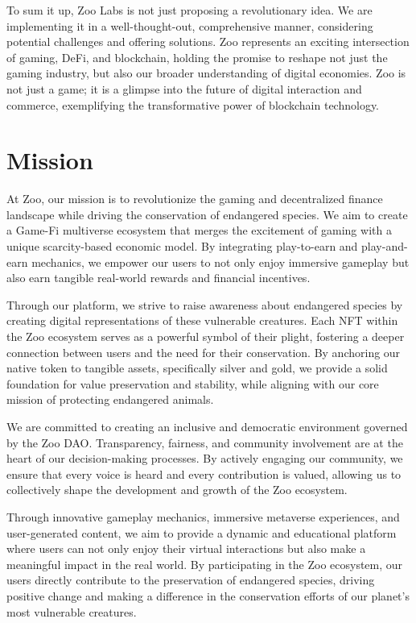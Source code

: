 To sum it up, Zoo Labs is not just proposing a revolutionary idea. We are implementing it in a well-thought-out, comprehensive manner, considering potential challenges and offering solutions. Zoo represents an exciting intersection of gaming, DeFi, and blockchain, holding the promise to reshape not just the gaming industry, but also our broader understanding of digital economies. Zoo is not just a game; it is a glimpse into the future of digital interaction and commerce, exemplifying the transformative power of blockchain technology.

\section{Mission}
\label{sec:mission}

At Zoo, our mission is to revolutionize the gaming and decentralized finance landscape while driving the conservation of endangered species. We aim to create a Game-Fi multiverse ecosystem that merges the excitement of gaming with a unique scarcity-based economic model. By integrating play-to-earn and play-and-earn mechanics, we empower our users to not only enjoy immersive gameplay but also earn tangible real-world rewards and financial incentives.

Through our platform, we strive to raise awareness about endangered species by creating digital representations of these vulnerable creatures. Each NFT within the Zoo ecosystem serves as a powerful symbol of their plight, fostering a deeper connection between users and the need for their conservation. By anchoring our native token to tangible assets, specifically silver and gold, we provide a solid foundation for value preservation and stability, while aligning with our core mission of protecting endangered animals.

We are committed to creating an inclusive and democratic environment governed by the Zoo DAO. Transparency, fairness, and community involvement are at the heart of our decision-making processes. By actively engaging our community, we ensure that every voice is heard and every contribution is valued, allowing us to collectively shape the development and growth of the Zoo ecosystem.

Through innovative gameplay mechanics, immersive metaverse experiences, and user-generated content, we aim to provide a dynamic and educational platform where users can not only enjoy their virtual interactions but also make a meaningful impact in the real world. By participating in the Zoo ecosystem, our users directly contribute to the preservation of endangered species, driving positive change and making a difference in the conservation efforts of our planet's most vulnerable creatures.

